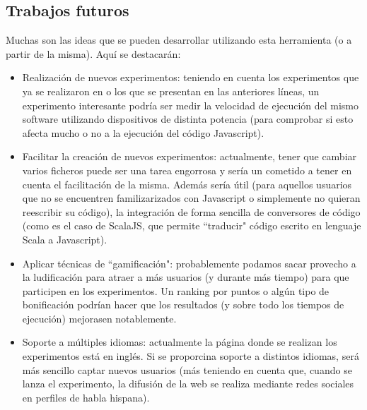 \documentclass[runningheads,a4paper]{llncs}
\begin{document}
\subsection{Trabajos futuros}
Muchas son las ideas que se pueden desarrollar utilizando esta herramienta (o a
partir de la misma). Aqu\'i se destacar\'an:
\begin{itemize}
  \item Realizaci\'on de nuevos experimentos: teniendo en cuenta los experimentos
  que ya se realizaron en \cite{nodio} o los que se presentan en las anteriores l\'ineas,
  un experimento interesante podr\'ia ser medir la velocidad de ejecuci\'on del
  mismo software utilizando dispositivos de distinta potencia (para comprobar
  si esto afecta mucho o no a la ejecuci\'on del c\'odigo Javascript).
  \item Facilitar la creaci\'on de nuevos experimentos: actualmente, tener que cambiar
  varios ficheros puede ser una tarea engorrosa y ser\'ia un cometido a tener en cuenta el
  facilitaci\'on de la misma. Adem\'as ser\'ia \'util (para
  aquellos usuarios que no se encuentren familizarizados con Javascript o simplemente
  no quieran reescribir su c\'odigo), la
  integraci\'on de forma sencilla de conversores de c\'odigo (como es el caso de ScalaJS,
  que permite ``traducir" c\'odigo escrito en lenguaje Scala a Javascript).
  \item Aplicar t\'ecnicas de ``gamificaci\'on": probablemente podamos sacar
  provecho a la ludificaci\'on para atraer a m\'as usuarios (y durante m\'as tiempo)
  para que participen en los experimentos. Un ranking por puntos o alg\'un tipo de
  bonificaci\'on podr\'ian hacer que los resultados (y sobre todo los tiempos de
  ejecuci\'on) mejorasen notablemente.
  \item Soporte a m\'ultiples idiomas: actualmente la p\'agina donde se realizan los
  experimentos est\'a en ingl\'es. Si se proporcina soporte a distintos idiomas,
  ser\'a m\'as sencillo captar nuevos usuarios (m\'as teniendo en cuenta que,
  cuando se lanza el experimento, la difusi\'on de la web se realiza mediante
  redes sociales en perfiles de habla hispana).
\end{itemize}





\nocite{*}
\end{document}

